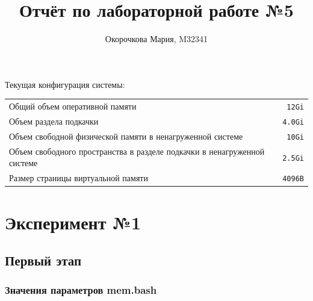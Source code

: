 \documentclass[10pt, a4paper]{article}
\begin{document}
\title{Отчёт по лабораторной работе №5}
\author{Окорочкова Мария, M32341}

\maketitle

Текущая конфигурация системы:

\begin{tabular}{|l|r|}
      \hline
    Общий объем оперативной памяти & \texttt{12Gi} \\
    Объем раздела подкачки & \texttt{4.0Gi} \\
    Объем свободной физической памяти в ненагруженной системе & \texttt{10Gi} \\
    Объем свободного пространства в разделе подкачки в ненагруженной системе & \texttt{2.5Gi} \\
    Размер страницы виртуальной памяти & \texttt{4096B} \\
    \hline
\end{tabular}

\section*{Эксперимент №1}

\subsection*{Первый этап}

\subsubsection*{Значения параметров mem.bash}
\end{document}
